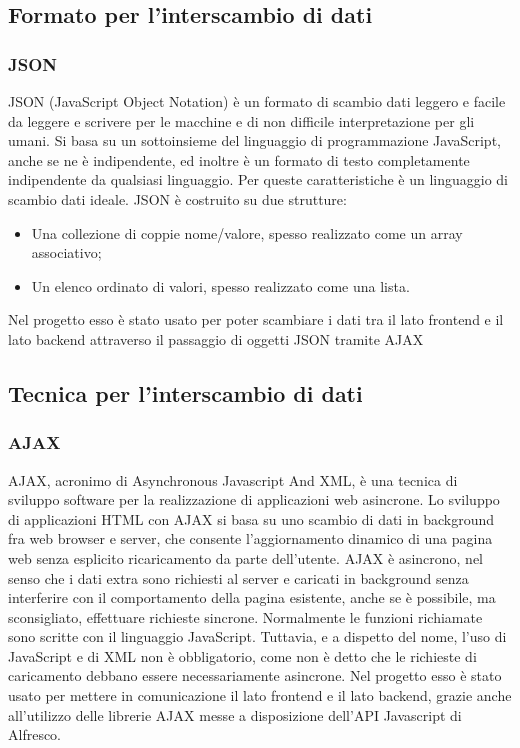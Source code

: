 \subsection{Formato per l’interscambio di dati}
\subsubsection{JSON}
JSON (JavaScript Object Notation) è un formato di scambio dati leggero e facile
da leggere e scrivere per le macchine e di non difficile interpretazione per gli umani. Si basa su un sottoinsieme del
linguaggio di programmazione JavaScript, anche se ne è indipendente, ed  inoltre è un formato di testo completamente indipendente da qualsiasi linguaggio.
Per queste caratteristiche è un linguaggio di scambio dati ideale. JSON è costruito su
due strutture:
\begin{itemize}
\item Una collezione di coppie nome/valore, spesso realizzato come un array associativo;
\item Un elenco ordinato di valori, spesso realizzato come una lista.
\end{itemize}
Nel progetto esso è stato usato per poter scambiare i dati tra il lato frontend e il lato backend attraverso il passaggio di oggetti JSON tramite AJAX
\subsection{Tecnica per l’interscambio di dati}
\subsubsection{AJAX}
AJAX, acronimo di Asynchronous Javascript And XML, è una tecnica di sviluppo
software per la realizzazione di applicazioni web asincrone.
Lo sviluppo di applicazioni HTML con AJAX si basa su uno scambio di dati in
background fra web browser e server, che consente l’aggiornamento dinamico di una
pagina web senza esplicito ricaricamento da parte dell’utente.
AJAX è asincrono, nel senso che i dati extra sono richiesti al server e caricati in
background senza interferire con il comportamento della pagina esistente, anche se è possibile, ma sconsigliato, effettuare richieste sincrone. Normalmente
le funzioni richiamate sono scritte con il linguaggio JavaScript. Tuttavia, e a dispetto
del nome, l’uso di JavaScript e di XML non è obbligatorio, come non è detto che le
richieste di caricamento debbano essere necessariamente asincrone.
Nel progetto esso è stato usato per mettere in comunicazione il lato frontend e il lato backend, grazie anche all'utilizzo delle librerie AJAX messe a disposizione dell'API Javascript di Alfresco.
